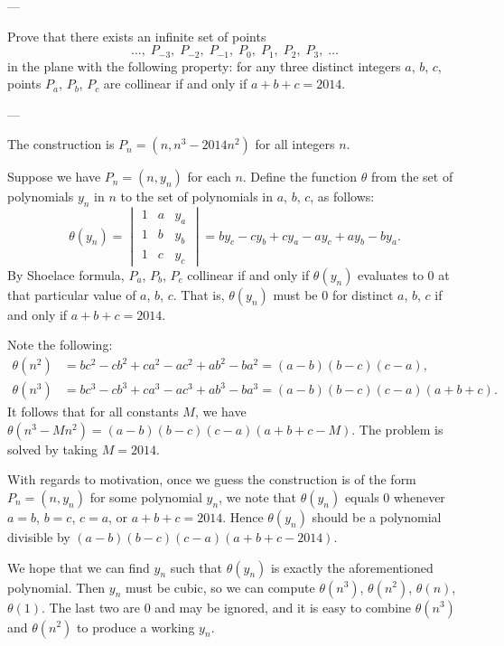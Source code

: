 
---

Prove that there exists an infinite set of points \[\ldots,\;P_{-3},\;P_{-2},\;P_{-1},\;P_0,\;P_1,\;P_2,\;P_3,\;\ldots\]
in the plane with the following property: for any three distinct integers $a$, $b$, $c$, points $P_a$, $P_b$, $P_c$ are collinear if and only if $a+b+c=2014$.

---

The construction is $P_n=\left(n,n^3-2014n^2\right)$ for all integers $n$.

Suppose we have $P_n=(n,y_n)$ for each $n$. Define the function $\theta$ from the set of polynomials $y_n$ in $n$ to the set of polynomials in $a$, $b$, $c$, as follows: \[\theta(y_n)=\begin{vmatrix}
    1&a&y_a\\ 1&b&y_b\\ 1&c&y_c
\end{vmatrix}=by_c-cy_b+cy_a-ay_c+ay_b-by_a.\]
By Shoelace formula, $P_a$, $P_b$, $P_c$ collinear if and only if $\theta(y_n)$ evaluates to $0$ at that particular value of $a$, $b$, $c$. That is, $\theta(y_n)$ must be $0$ for distinct $a$, $b$, $c$ if and only if $a+b+c=2014$.

Note the following:
\begin{align*}
    \theta\left(n^2\right)&=bc^2-cb^2+ca^2-ac^2+ab^2-ba^2=(a-b)(b-c)(c-a),\\
    \theta\left(n^3\right)&=bc^3-cb^3+ca^3-ac^3+ab^3-ba^3=(a-b)(b-c)(c-a)(a+b+c).
\end{align*}
It follows that for all constants $M$, we have $\theta\left(n^3-Mn^2\right)=(a-b)(b-c)(c-a)(a+b+c-M)$. The problem is solved by taking $M=2014$.
\begin{boxremark}
    With regards to motivation, once we guess the construction is of the form $P_n=(n,y_n)$ for some polynomial $y_n$, we note that $\theta(y_n)$ equals $0$ whenever $a=b$, $b=c$, $c=a$, or $a+b+c=2014$. Hence $\theta(y_n)$ should be a polynomial divisible by $(a-b)(b-c)(c-a)(a+b+c-2014)$.

    We hope that we can find $y_n$ such that $\theta(y_n)$ is exactly the aforementioned polynomial. Then $y_n$ must be cubic, so we can compute $\theta(n^3)$, $\theta(n^2)$, $\theta(n)$, $\theta(1)$. The last two are $0$ and may be ignored, and it is easy to combine $\theta(n^3)$ and $\theta(n^2)$ to produce a working $y_n$.
\end{boxremark}

